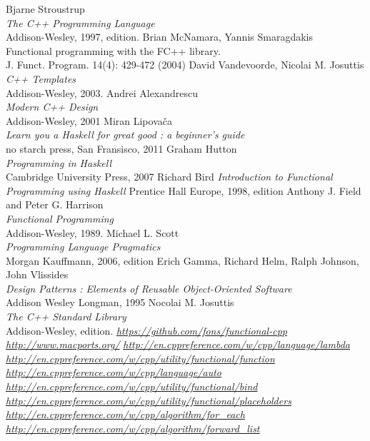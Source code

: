 \documentclass[12pt,fleqn]{article}
\begin{document}
\begin{thebibliography}{99}
Bjarne Stroustrup \\
{\em The C++ Programming Language} \\
Addison-Wesley, 1997,  edition.
Brian McNamara, Yannis Smaragdakis  \\
Functional programming with the FC++ library. \\
J. Funct. Program. 14(4): 429-472 (2004)
David Vandevoorde, Nicolai M. Josuttis \\
{\em C++ Templates} \\
Addison-Wesley, 2003.
%
Andrei Alexandrescu \\
{\em Modern C++ Design} \\
Addison-Wesley, 2001
%
 Miran Lipova\v{c}a\\
{\em Learn you a Haskell for great good : a beginner's guide}\\
no starch press, San Fransisco, 2011
Graham Hutton \\
{\em Programming in Haskell} \\
Cambridge University Press, 2007
Richard Bird
{\em Introduction to Functional Programming using Haskell}
Prentice Hall Europe, 1998,  edition
Anthony J. Field and Peter G. Harrison \\
{\em Functional Programming} \\
Addison-Wesley, 1989.
Michael L. Scott \\
{\em Programming Language Pragmatics} \\
Morgan Kauffmann, 2006,  edition
Erich Gamma, Richard Helm, Ralph Johnson, John Vlissides \\
{\em Design Patterns : Elements of Reusable Object-Oriented Software} \\
Addison Wesley Longman, 1995
Nocolai M. Josuttis \\
{\em The C++ Standard Library}\\
Addison-Wesley,  edition.
\underline{\em https://github.com/fons/functional-cpp}
\underline {\em http://www.macports.org/}
\underline{\em http://en.cppreference.com/w/cpp/language/lambda}
\underline{\em http://en.cppreference.com/w/cpp/utility/functional/function}
\underline{\em http://en.cppreference.com/w/cpp/language/auto}
\underline{\em http://en.cppreference.com/w/cpp/utility/functional/bind}
\underline{\em http://en.cppreference.com/w/cpp/utility/functional/placeholders}
\underline{\em http://en.cppreference.com/w/cpp/algorithm/for\_each}
%
\underline{\em http://en.cppreference.com/w/cpp/algorithm/forward\_list}


\end{thebibliography}
\end{document}
